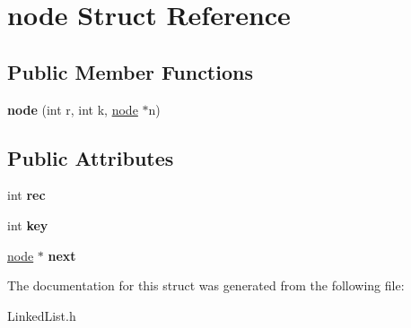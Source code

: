 \hypertarget{structnode}{}\section{node Struct Reference}
\label{structnode}
\subsection*{Public Member Functions}
\begin{DoxyCompactItemize}
\item 
\hypertarget{structnode_a746c77727fa8534a1dcfff2b33450473}{}{\bfseries node} (int r, int k, \hyperlink{structnode}{node} $\ast$n)\label{structnode_a746c77727fa8534a1dcfff2b33450473}

\end{DoxyCompactItemize}
\subsection*{Public Attributes}
\begin{DoxyCompactItemize}
\item 
\hypertarget{structnode_aa417b065e499ba672c4ffcd687960b8c}{}int {\bfseries rec}\label{structnode_aa417b065e499ba672c4ffcd687960b8c}

\item 
\hypertarget{structnode_aa1417e7fad3ebcf42dc0ec8b711f273d}{}int {\bfseries key}\label{structnode_aa1417e7fad3ebcf42dc0ec8b711f273d}

\item 
\hypertarget{structnode_aad210fa7c160a49f6b9a3ffee592a2bc}{}\hyperlink{structnode}{node} $\ast$ {\bfseries next}\label{structnode_aad210fa7c160a49f6b9a3ffee592a2bc}

\end{DoxyCompactItemize}


The documentation for this struct was generated from the following file\+:\begin{DoxyCompactItemize}
\item 
Linked\+List.\+h\end{DoxyCompactItemize}
